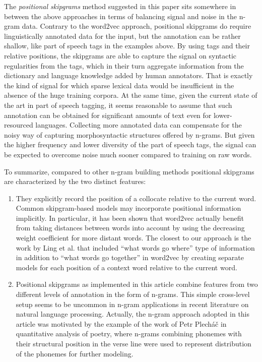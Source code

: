 \documentclass[12pt]{article}
\begin{document}
The \textit{positional skipgrams} method suggested in this paper sits
somewhere in between the above approaches in terms of balancing signal
and noise in the n-gram data. Contrary to the word2vec approach,
positional skipgrams do require linguistically annotated data for the
input, but the annotation can be rather shallow, like part of speech
tags in the examples above.  By using tags and their relative
positions, the skipgrams are able to capture the signal on syntactic
regularities from the tags, which in their turn aggregate information
from the dictionary and language knowledge added by human annotators. That
is exactly the kind of signal for which sparse lexical data would be
insufficient in the absence of the huge training corpora. At the same
time, given the current state of the art in part of speech tagging, it
seems reasonable to assume that such annotation can be obtained for
significant amounts of text even for lower-resourced
languages. Collecting more annotated data can compensate for the noisy
way of capturing morphosyntactic structures offered by n-grams. But
given the higher frequency and lower diversity of the part of speech tags,
the signal can be expected to overcome noise much sooner compared to
training on raw words.

To summarize, compared to other n-gram building methods positional
skipgrams are characterized by the two distinct features:

\begin{enumerate}
\item They explicitly record the position of a collocate relative to
  the current word. Common skipgram-based models may incorporate
  positional information implicitly. In particular, it has been shown
  that word2vec actually benefit from taking distances between words
  into account by using the decreasing weight coefficient for more
  distant words. The closest to our approach
  is the work by Ling et al. that included “what words go where” type
  of information in addition to “what words go together” in word2vec
  by creating separate models for each position of a context word
  relative to the current word.
\item Positional skipgrams as implemented in this article combine
  features from two different levels of annotation in the form of
  n-grams. This simple cross-level setup seems to be uncommon in
  n-gram applications in recent literature on natural language
  processing. Actually, the n-gram approach adopted in this article
  was motivated by the example of the work of Petr Plech\'a\v{c} in
  quantitative analysis of poetry, where n-grams combining phonemes with
  their structural position in the verse line were used to represent
  distribution of the phonemes for further modeling.
\end{enumerate}
\end{document}
